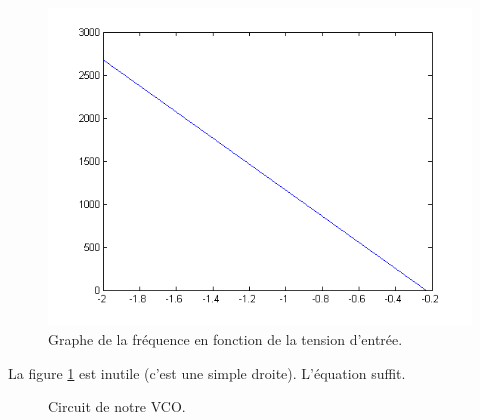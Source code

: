 \begin{figure}[ht]
	\centering
	\includegraphics[scale=0.65]{img/freq-vs-vin.png}
	\caption{Graphe de la fréquence en fonction de la tension d'entrée.}
	\label{fig:f-vs-vin}
\end{figure}

\begin{correction}
	La figure \ref{fig:f-vs-vin} est inutile (c'est une simple droite).
	L'équation suffit.
\end{correction}

\begin{figure}[ht]
	\centering
	\caption{Circuit de notre VCO.}
	\label{fig:circuit}
\end{figure}

